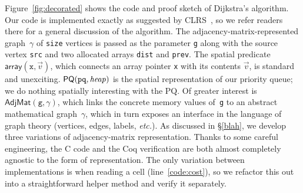 Figure~\ref{fig:decorated} shows the code and proof
sketch of Dijkstra's algorithm.  Our code is implemented exactly
as suggested by CLRS~\cite{clrs}, so we refer readers there for a
general discussion of the algorithm.
The adjacency-matrix-represented graph~$\gamma$ of \texttt{size} vertices
is passed as the parameter \texttt{g} along with the source vertex \texttt{src}
and two allocated arrays \texttt{dist} and \texttt{prev}.
The spatial predicate $\mathsf{array}(\texttt{x},\vec{v})$, which connects 
an array pointer \texttt{x} with its contents $\vec{v}$, is standard and unexciting.
$\mathsf{PQ}(\texttt{pq},\mathit{heap})$ is the spatial 
representation of our priority queue;
we do nothing spatially interesting with the PQ.
Of greater interest is $\mathsf{AdjMat}(\texttt{g},\gamma)$, which
links the concrete memory values of~\texttt{g} to an abstract mathematical
graph~$\gamma$, which in turn exposes an interface in the 
language of graph theory (vertices, edges, labels, \emph{etc.}).
As discussed in \S\ref{blah}, we develop three variations of 
adjacency-matrix representation. 
Thanks to some careful engineering, the C code and 
the Coq verification are both almost completely agnostic to 
the form of representation. The only variation between implementations 
is when reading a cell (line~\ref{code:cost}), so we 
refactor this out into a straightforward helper method and 
verify it separately.






